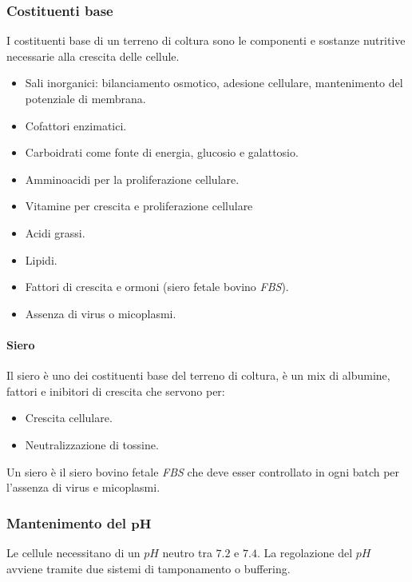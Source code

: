		\subsubsection{Costituenti base}
		I costituenti base di un terreno di coltura sono le componenti e sostanze nutritive necessarie alla crescita delle cellule.
		\begin{multicols}{2}
			\begin{itemize}
				\item Sali inorganici: bilanciamento osmotico, adesione cellulare, mantenimento del potenziale di membrana.
				\item Cofattori enzimatici.
				\item Carboidrati come fonte di energia, glucosio e galattosio.
				\item Amminoacidi per la proliferazione cellulare.
				\item Vitamine per crescita e proliferazione cellulare
				\item Acidi grassi.
				\item Lipidi.
				\item Fattori di crescita e ormoni (siero fetale bovino \emph{FBS}).
				\item Assenza di virus o micoplasmi.
			\end{itemize}
		\end{multicols}
			\paragraph{Siero}
			Il siero \`e uno dei costituenti base del terreno di coltura, \`e un mix di albumine, fattori e inibitori di crescita che servono per:
		\begin{multicols}{2}
			\begin{itemize}
				\item Crescita cellulare.
				\item Neutralizzazione di tossine.
			\end{itemize}
		\end{multicols}
			Un siero \`e il siero bovino fetale \emph{FBS} che deve esser controllato in ogni batch per l'assenza di virus e micoplasmi. 
		
		\subsubsection{Mantenimento del $\mathbf{pH}$}
		Le cellule necessitano di un $pH$ neutro tra $7.2$ e $7.4$.
		La regolazione del $pH$ avviene tramite due sistemi di tamponamento o buffering.

